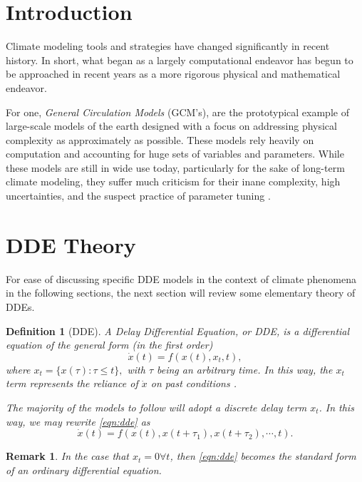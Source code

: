 \documentclass[12pt]{article}
\newtheorem{definition}{Definition}
\newtheorem{remark}{Remark}
\begin{document}
\section{Introduction}

Climate modeling tools and strategies have changed significantly in recent history. In short, what began as a largely computational endeavor has begun to be approached in recent years as a more rigorous physical and mathematical endeavor.

For one, \emph{General Circulation Models} (GCM's), are the prototypical example of large-scale models of the earth designed with a focus on addressing physical complexity as approximately as possible. These models rely heavily on computation and accounting for huge sets of variables and parameters. While these models are still in wide use today, particularly for the sake of long-term climate modeling, they suffer much criticism for their inane complexity, high uncertainties, and the suspect practice of parameter tuning \cite{gcmobsolete} \cite{climatedde}.

\section{DDE Theory}

For ease of discussing specific DDE models in the context of climate phenomena in the following sections, the next section will review some elementary theory of DDEs.

\begin{definition}[DDE]
    A Delay Differential Equation, or DDE, is a differential equation of the general form (in the first order) \begin{equation}\label{eqn:dde}
    \dot{x}(t) = f(x(t), x_t, t),
    \end{equation}
    where $x_t = \{x(\tau) : \tau \leq t\},$ with $\tau$ being an arbitrary time. In this way, the $x_t$ term represents the reliance of $\dot{x}$ on past conditions\cite{DDEtext} \cite{functionalDDEtext}.

    The majority of the models to follow will adopt a discrete delay term $x_t$. In this way, we may rewrite \cref{eqn:dde} as \begin{equation}\label{eqn:discretedde}
        \dot{x}(t) = f(x(t), x(t + \tau_1), x(t+\tau_2), \cdots, t).
    \end{equation}
\end{definition}


\begin{remark}
    In the case that $x_t = 0 \forall t$, then \cref{eqn:dde} becomes the standard form of an ordinary differential equation.
\end{remark}
\end{document}
